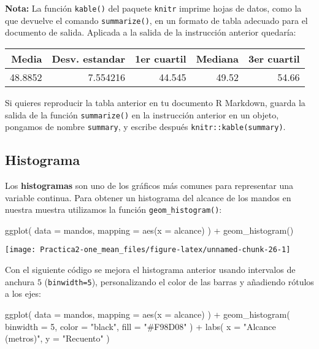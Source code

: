 \documentclass[
  degree=mecinf,
  title=normal,
  toc=normal,
  bib=normal]{mnye}
\newenvironment{Shaded}{\begin{snugshade}}{\end{snugshade}}
\newcommand{\AttributeTok}[1]{\textcolor[rgb]{0.77,0.63,0.00}{#1}}
\newcommand{\DecValTok}[1]{\textcolor[rgb]{0.00,0.00,0.81}{#1}}
\newcommand{\FunctionTok}[1]{\textcolor[rgb]{0.00,0.00,0.00}{#1}}
\newcommand{\NormalTok}[1]{#1}
\newcommand{\SpecialCharTok}[1]{\textcolor[rgb]{0.00,0.00,0.00}{#1}}
\newcommand{\StringTok}[1]{\textcolor[rgb]{0.31,0.60,0.02}{#1}}
\begin{document}
\textbf{Nota:} La función \texttt{kable()} del paquete \texttt{knitr} imprime hojas de datos, como la que devuelve el comando \texttt{summarize()}, en un formato de tabla adecuado para el documento de salida. Aplicada a la salida de la instrucción anterior quedaría:

\begin{tabular}{r|r|r|r|r}
\hline
Media & Desv. estandar & 1er cuartil & Mediana & 3er cuartil\\
\hline
48.8852 & 7.554216 & 44.545 & 49.52 & 54.66\\
\hline
\end{tabular}

Si quieres reproducir la tabla anterior en tu documento R Markdown, guarda la salida de la función \texttt{summarize()} en la instrucción anterior en un objeto, pongamos de nombre \texttt{summary}, y escribe después \texttt{knitr::kable(summary)}.

\hypertarget{histogram}{%
\subsection{Histograma}\label{histogram}}

Los \textbf{histogramas} son uno de los gráficos más comunes para representar una variable continua. Para obtener un histograma del alcance de los mandos en nuestra muestra utilizamos la función \texttt{geom\_histogram()}:

\begin{Shaded}
\begin{Highlighting}[]
\FunctionTok{ggplot}\NormalTok{(}
    \AttributeTok{data =}\NormalTok{ mandos,}
    \AttributeTok{mapping =} \FunctionTok{aes}\NormalTok{(}\AttributeTok{x =}\NormalTok{ alcance)}
\NormalTok{) }\SpecialCharTok{+}
\FunctionTok{geom\_histogram}\NormalTok{() }
\end{Highlighting}
\end{Shaded}

\begin{center}\texttt{[image: Practica2-one\_mean\_files/figure-latex/unnamed-chunk-26-1]} \end{center}

Con el siguiente código se mejora el histograma anterior usando intervalos de anchura \(5\) (\texttt{binwidth=5}), personalizando el color de las barras y añadiendo rótulos a los ejes:

\begin{Shaded}
\begin{Highlighting}[]
\FunctionTok{ggplot}\NormalTok{(}
    \AttributeTok{data =}\NormalTok{ mandos,}
    \AttributeTok{mapping =} \FunctionTok{aes}\NormalTok{(}\AttributeTok{x =}\NormalTok{ alcance)}
\NormalTok{) }\SpecialCharTok{+}
\FunctionTok{geom\_histogram}\NormalTok{(}
    \AttributeTok{binwidth =} \DecValTok{5}\NormalTok{,}
    \AttributeTok{color =} \StringTok{"black"}\NormalTok{,}
    \AttributeTok{fill =} \StringTok{"\#F98D08"}
\NormalTok{) }\SpecialCharTok{+} 
\FunctionTok{labs}\NormalTok{( }
  \AttributeTok{x =} \StringTok{"Alcance (metros)"}\NormalTok{,}
  \AttributeTok{y =} \StringTok{"Recuento"}
\NormalTok{)}
\end{Highlighting}
\end{Shaded}
\end{document}
